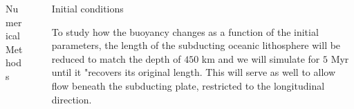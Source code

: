 \documentclass[final]{beamer}
\newlength{\sepwidth}
\newlength{\colwidth}
\newcommand{\separatorcolumn}{\begin{column}{\sepwidth}\end{column}}
\begin{document}
\begin{frame}[t]
\begin{columns}[t]
\begin{column}{\colwidth}
\begin{block}{Numerical Methods}
  \end{block}
  
\end{column}


\separatorcolumn

\begin{column}{\colwidth}
  
  \begin{block}{Initial conditions}
  
    To study how the buoyancy changes as a function of the initial parameters, the length of the subducting oceanic lithosphere will be reduced to match the depth of $450$ km and we will simulate for $5$ Myr until it "recovers its original length. This will serve as well to allow flow beneath the subducting plate, restricted to the longitudinal direction.
  

\end{block}
\end{column}
\end{columns}
\end{frame}
\end{document}
